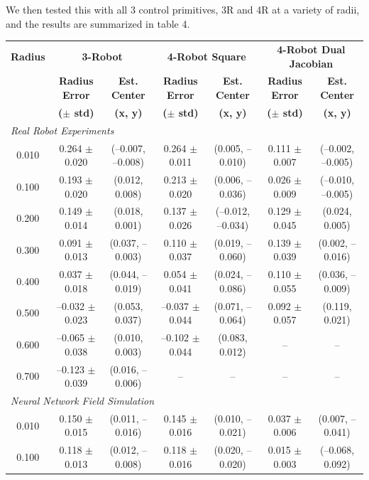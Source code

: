 \documentclass[lettersize,journal]{IEEEtran}
\begin{document}
We then tested this with all 3 control primitives, 3R and 4R at a variety of radii, and the results are summarized in table 4.

\begin{table}[h]
\centering
\small
\begin{tabular}{ccccccc}
\hline
\textbf{Radius} & \multicolumn{2}{c}{\textbf{3-Robot}} & \multicolumn{2}{c}{\textbf{4-Robot Square}} & \multicolumn{2}{c}{\textbf{4-Robot Dual Jacobian}} \\
 & \textbf{Radius Error} & \textbf{Est. Center} & \textbf{Radius Error} & \textbf{Est. Center} & \textbf{Radius Error} & \textbf{Est. Center} \\
 & \textbf{($\pm$ std)} & \textbf{(x, y)} & \textbf{($\pm$ std)} & \textbf{(x, y)} & \textbf{($\pm$ std)} & \textbf{(x, y)} \\
\hline
\multicolumn{7}{l}{\textit{Real Robot Experiments}} \\
\hline
0.010 & 0.264 $\pm$ 0.020 & (--0.007, --0.008) & 0.264 $\pm$ 0.011 & (0.005, --0.010) & 0.111 $\pm$ 0.007 & (--0.002, --0.005) \\
0.100 & 0.193 $\pm$ 0.020 & (0.012, 0.008) & 0.213 $\pm$ 0.020 & (0.006, --0.036) & 0.026 $\pm$ 0.009 & (--0.010, --0.005) \\
0.200 & 0.149 $\pm$ 0.014 & (0.018, 0.001) & 0.137 $\pm$ 0.026 & (--0.012, --0.034) & 0.129 $\pm$ 0.045 & (0.024, 0.005) \\
0.300 & 0.091 $\pm$ 0.013 & (0.037, --0.003) & 0.110 $\pm$ 0.037 & (0.019, --0.060) & 0.139 $\pm$ 0.039 & (0.002, --0.016) \\
0.400 & 0.037 $\pm$ 0.018 & (0.044, --0.019) & 0.054 $\pm$ 0.041 & (0.024, --0.086) & 0.110 $\pm$ 0.055 & (0.036, --0.009) \\
0.500 & --0.032 $\pm$ 0.023 & (0.053, 0.037) & --0.037 $\pm$ 0.044 & (0.071, --0.064) & 0.092 $\pm$ 0.057 & (0.119, 0.021) \\
0.600 & --0.065 $\pm$ 0.038 & (0.010, 0.003) & --0.102 $\pm$ 0.044 & (0.083, 0.012) & -- & -- \\
0.700 & --0.123 $\pm$ 0.039 & (0.016, --0.006) & -- & -- & -- & -- \\
\hline
\multicolumn{7}{l}{\textit{Neural Network Field Simulation}} \\
\hline
0.010 & 0.150 $\pm$ 0.015 & (0.011, --0.016) & 0.145 $\pm$ 0.016 & (0.010, --0.021) & 0.037 $\pm$ 0.006 & (0.007, --0.041) \\
0.100 & 0.118 $\pm$ 0.013 & (0.012, --0.008) & 0.118 $\pm$ 0.016 & (0.020, --0.020) & 0.015 $\pm$ 0.003 & (--0.068, 0.092) \\

\end{tabular}
\end{table}
\end{document}
